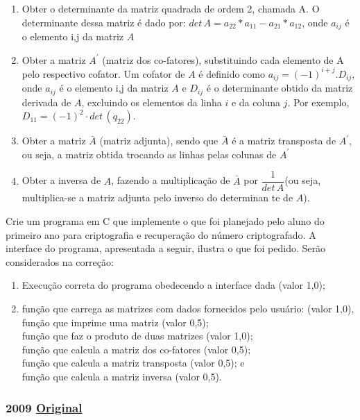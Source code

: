 \documentclass[12pt,a4paper]{article}
\newcommand{\original}[1]{\tiny \href{#1}{Original} \normalsize}
\begin{document}
\begin{enumerate}[label=(\arabic*)]
\item Obter o determinante da matriz quadrada de ordem 2, chamada A. O determinante dessa matriz é dado por: $det\,A=a_{22}*a_{11}-a_{21}*a_{12}$, onde $a_{ij}$ é o elemento i,j da matriz $A$
\item Obter a matriz $A^{\prime}$ (matriz dos co-fatores), substituindo cada elemento de A pelo respectivo cofator. Um cofator de $A$ é definido como $a_{ij}=(-1)^{i+j}.D_{ij}$, onde $a_{ij}$ é o elemento i,j da matriz $A$ e $D_{ij}$ é o determinante obtido da matriz derivada de $A$, excluindo os elementos da linha $i$ e da coluna $j$. Por exemplo, $D_{11}=(-1)^2\cdot det\,(q_{22})$.
\item Obter a matriz $\bar{A}$ (matriz adjunta), sendo que $\bar{A}$ é a matriz transposta de $A^{\prime}$, ou seja, a matriz obtida trocando as linhas pelas colunas de $A^{\prime}$
\item Obter a inversa de $A$, fazendo a multiplicação de $\bar{A}$ por $\dfrac{1}{det\,A}$(ou seja, multiplica-se a matriz adjunta pelo inverso do determinan te de $A$).
\end{enumerate}
Crie um programa em C que implemente o que foi planejado pelo aluno do primeiro ano para criptografia e recuperação do número criptografado. A interface do programa, apresentada a seguir, ilustra o que foi pedido. Serão considerados na correção:
\begin{enumerate}[label=(\arabic*)]
\item  Execução correta do programa obedecendo a interface dada (valor 1,0);
\item função que carrega as matrizes com dados fornecidos pelo usuário: (valor 1,0),\\
função que imprime uma matriz (valor 0,5);\\
função que faz o produto de duas matrizes (valor 1,0);\\
função que calcula a matriz dos co-fatores (valor 0,5);\\
função que calcula a matriz transposta (valor 0,5); e\\
função que calcula a matriz inversa (valor 0,5).
\end{enumerate}


\newpage
\subsubsection{2009 \original{https://drive.google.com/file/d/1zxrGHAACXl1NuK9TfKUsTgyYb0Nk4oKc/view?usp=sharing}}
\end{document}
